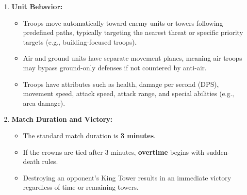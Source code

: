 \documentclass{article}
\begin{document}
\begin{enumerate}[label=\arabic*.]
    \item \textbf{Unit Behavior:}
    \begin{itemize}
        \item Troops move automatically toward enemy units or towers following predefined paths, typically targeting the nearest threat or specific priority targets (e.g., building-focused troops).
        \item Air and ground units have separate movement planes, meaning air troops may bypass ground-only defenses if not countered by anti-air.
        \item Troops have attributes such as health, damage per second (DPS), movement speed, attack speed, attack range, and special abilities (e.g., area damage).
    \end{itemize}

    \item \textbf{Match Duration and Victory:}
    \begin{itemize}
        \item The standard match duration is \textbf{3 minutes}.
        \item If the crowns are tied after 3 minutes, \textbf{overtime} begins with sudden-death rules.
        \item Destroying an opponent’s King Tower results in an immediate victory regardless of time or remaining towers.
    \end{itemize}
\end{enumerate}
\end{document}
